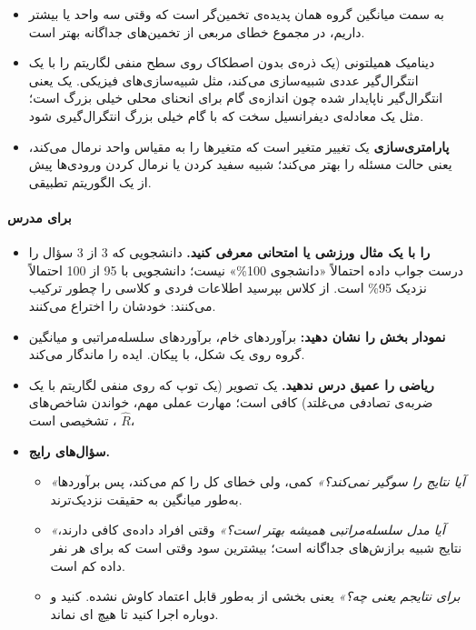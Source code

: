 \begin{itemize}
\tightlist
\item
   به سمت میانگین گروه همان پدیده‌ی تخمین‌گر
  \textbf{} است که وقتی سه واحد یا بیشتر داریم، در
  مجموع خطای مربعی از تخمین‌های  جداگانه بهتر است.
\item
  \textbf{} دینامیک همیلتونی (یک ذره‌ی بدون اصطکاک روی سطح
  منفی لگاریتم  را با یک انتگرال‌گیر عددی 
  شبیه‌سازی می‌کند، مثل شبیه‌سازی‌های فیزیکی. یک \textbf{}
  یعنی انتگرال‌گیر ناپایدار شده چون اندازه‌ی گام برای انحنای محلی خیلی
  بزرگ است؛ مثل یک معادله‌ی دیفرانسیل سخت  که با گام خیلی
  بزرگ انتگرال‌گیری شود.
\item
  \textbf{پارامتری‌سازی } یک تغییر متغیر است که متغیرها
  را به مقیاس واحد نرمال می‌کند، یعنی حالت  مسئله را
  بهتر می‌کند؛ شبیه سفید کردن یا نرمال کردن ورودی‌ها پیش از یک الگوریتم
  تطبیقی.
\end{itemize}

\paragraph{برای مدرس}

\begin{itemize}
\tightlist
\item
  \textbf{ را با یک مثال ورزشی یا امتحانی معرفی کنید.}
  دانشجویی که 3 از 3 سؤال را درست جواب داده احتمالاً «دانشجوی 100\%»
  نیست؛ دانشجویی با 95 از 100 احتمالاً نزدیک 95\% است. از کلاس بپرسید
  اطلاعات فردی و کلاسی را چطور ترکیب می‌کنند: خودشان 
  را اختراع می‌کنند.
\item
  \textbf{نمودار  بخش  را نشان دهید:} برآوردهای
  خام، برآوردهای سلسله‌مراتبی و میانگین گروه روی یک شکل، با پیکان. ایده
  را ماندگار می‌کند.
\item
  \textbf{ریاضی  را عمیق درس ندهید.} یک تصویر (یک توپ که روی
  منفی لگاریتم  با یک ضربه‌ی تصادفی می‌غلتد) کافی است؛ مهارت
  عملی مهم، خواندن شاخص‌های تشخیصی است ، \(\hat R\)،
\item
  \textbf{سؤال‌های رایج.}

  \begin{itemize}
  \tightlist
  \item
    \emph{«آیا  نتایج را سوگیر نمی‌کند؟»} کمی، ولی خطای کل
    را کم می‌کند، پس برآوردها به‌طور میانگین به حقیقت نزدیک‌ترند.
  \item
    \emph{«آیا مدل سلسله‌مراتبی همیشه بهتر است؟»} وقتی افراد داده‌ی کافی
    دارند، نتایج شبیه برازش‌های جداگانه است؛ بیشترین سود وقتی است که برای
    هر نفر داده کم است.
  \item
    \emph{ برای نتایجم یعنی چه؟»} یعنی بخشی از
     به‌طور قابل اعتماد کاوش نشده.  کنید
    و دوباره اجرا کنید تا هیچ ای نماند.
  \end{itemize}
\end{itemize}


